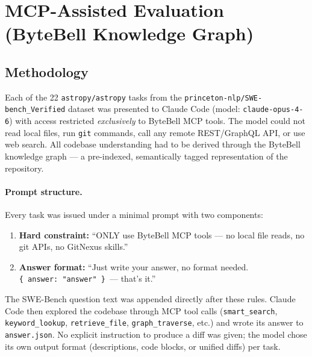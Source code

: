
\section{MCP-Assisted Evaluation (ByteBell Knowledge Graph)}\label{sec:mcp}

\subsection{Methodology}

Each of the 22 \texttt{astropy/astropy} tasks from the
\texttt{princeton-nlp/SWE-bench\_Verified} dataset was presented to
Claude Code (model: \texttt{claude-opus-4-6}) with access restricted
\emph{exclusively} to ByteBell MCP tools.
The model could not read local files, run \texttt{git} commands, call
any remote REST/GraphQL API, or use web search.
All codebase understanding had to be derived through the ByteBell
knowledge graph --- a pre-indexed, semantically tagged representation of
the repository.

\paragraph{Prompt structure.}
Every task was issued under a minimal prompt with two components:

\begin{enumerate}
  \item \textbf{Hard constraint:} ``ONLY use ByteBell MCP tools --- no
        local file reads, no git APIs, no GitNexus skills.''
  \item \textbf{Answer format:} ``Just write your answer, no format
        needed.  \texttt{\{\ answer:\ "answer"\ \}}\ --- that's it.''
\end{enumerate}

\noindent
The SWE-Bench question text was appended directly after these rules.
Claude Code then explored the codebase through MCP tool calls
(\texttt{smart\_search}, \texttt{keyword\_lookup},
\texttt{retrieve\_file}, \texttt{graph\_traverse}, etc.) and wrote
its answer to \texttt{answer.json}.
No explicit instruction to produce a diff was given; the model chose
its own output format (descriptions, code blocks, or unified diffs)
per task.

